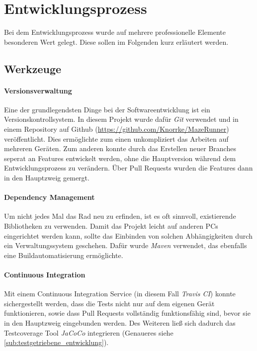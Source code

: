 \section{Entwicklungsprozess} %
\label{sec:entwicklungsprozess}

Bei dem Entwicklungsprozess wurde auf mehrere professionelle Elemente besonderen Wert gelegt. Diese sollen im Folgenden kurz erläutert werden.
\subsection{Werkzeuge} %
\label{sub:werkzeuge}
\paragraph{Versionsverwaltung} %
\label{par:versionsverwaltung}
Eine der grundlegendsten Dinge bei der Softwareentwicklung ist ein Versionskontrollsystem. In diesem Projekt wurde dafür \emph{Git} verwendet und in einem Repository auf Github (\url{https://github.com/Knorrke/MazeRunner}) veröffentlicht. Dies ermöglichte zum einen unkompliziert das Arbeiten auf mehreren Geräten. Zum anderen konnte durch das Erstellen neuer Branches seperat an Features entwickelt werden, ohne die Hauptversion während dem Entwicklungsprozess zu verändern. Über Pull Requests wurden die Features dann in den Hauptzweig gemergt.

\paragraph{Dependency Management} %
\label{par:dependency_management}
Um nicht jedes Mal das Rad neu zu erfinden, ist es oft sinnvoll, existierende Bibliotheken zu verwenden. Damit das Projekt leicht auf anderen PCs eingerichtet werden kann, sollte das Einbinden von solchen Abhängigkeiten durch ein Verwaltungssystem geschehen. Dafür wurde \emph{Maven} verwendet, das ebenfalls eine Buildautomatisierung ermöglichte.

\paragraph{Continuous Integration} %
\label{par:continuous_integration}
Mit einem Continuous Integration Service (in diesem Fall \emph{Travis CI}) konnte sichergestellt werden, dass die Tests nicht nur auf dem eigenen Gerät funktionieren, sowie dass Pull Requests vollständig funktionsfähig sind, bevor sie in den Hauptzweig eingebunden werden. Des Weiteren ließ sich dadurch das Testcoverage Tool \emph{JaCoCo} integrieren (Genaueres siehe \ref{sub:testgetriebene_entwicklung}).

